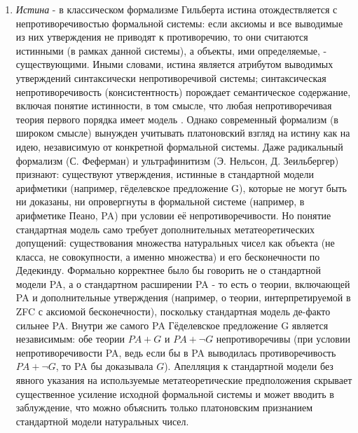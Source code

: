 \documentclass[12pt]{article}
\begin{document}
\begin{enumerate}
    \item {\it Истина} - в классическом формализме Гильберта истина отождествляется с непротиворечивостью формальной системы: если аксиомы и все выводимые из них утверждения не приводят к противоречию, то они считаются истинными (в рамках данной системы), а объекты, ими определяемые, - существующими. Иными словами, истина является атрибутом выводимых утверждений синтаксически непротиворечивой системы; синтаксическая непротиворечивость (консистентность) порождает семантическое содержание, включая понятие истинности, в том смысле, что любая непротиворечивая теория первого порядка имеет модель \cite{completeness-theorem}. Однако современный формализм (в широком смысле) вынужден учитывать платоновский взгляд на истину как на идею, независимую от конкретной формальной системы. Даже радикальный формализм (С. Феферман) и ультрафинитизм (Э. Нельсон, Д. Зеильбергер) признают: существуют утверждения, истинные в стандартной модели арифметики (например, гёделевское предложение G), которые не могут быть ни доказаны, ни опровергнуты в формальной системе (например, в арифметике Пеано, PA) при условии её непротиворечивости. Но понятие стандартная модель само требует дополнительных метатеоретических допущений: существования множества натуральных чисел как объекта (не класса, не совокупности, а именно множества) и его бесконечности по Дедекинду. Формально корректнее было бы говорить не о стандартной модели PA, а о стандартном расширении PA - то есть о теории, включающей PA и дополнительные утверждения (например, о теории, интерпретируемой в ZFC с аксиомой бесконечности), поскольку стандартная модель де-факто сильнее PA. Внутри же самого PA Гёделевское предложение G является независимым: обе теории $PA + G$ и $PA + \neg G$ непротиворечивы (при условии непротиворечивости PA, ведь если бы в PA выводилась противоречивость $PA + \neg G$, то PA бы доказывала $G$). Апелляция к стандартной модели без явного указания на используемые метатеоретические предположения скрывает существенное усиление исходной формальной системы и может вводить в заблуждение, что можно объяснить только платоновским признанием стандартной модели натуральных чисел.

\end{enumerate}
\end{document}
